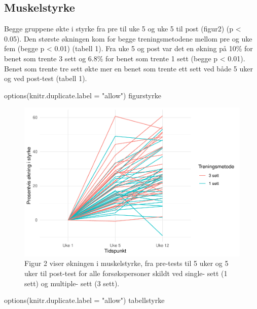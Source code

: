 \documentclass[
]{book}
\newenvironment{Shaded}{\begin{snugshade}}{\end{snugshade}}
\newcommand{\AttributeTok}[1]{\textcolor[rgb]{0.77,0.63,0.00}{#1}}
\newcommand{\FunctionTok}[1]{\textcolor[rgb]{0.00,0.00,0.00}{#1}}
\newcommand{\NormalTok}[1]{#1}
\newcommand{\StringTok}[1]{\textcolor[rgb]{0.31,0.60,0.02}{#1}}
\begin{document}
\hypertarget{muskelstyrke}{%
\subsection{Muskelstyrke}\label{muskelstyrke}}

Begge gruppene økte i styrke fra pre til uke 5 og uke 5 til post (figur2) (p \textless{} 0.05). Den største økningen kom for begge treningsmetodene mellom pre og uke fem (begge p \textless{} 0.01) (tabell 1). Fra uke 5 og post var det en økning på 10\% for benet som trente 3 sett og 6.8\% for benet som trente 1 sett (begge p \textless{} 0.01). Benet som trente tre sett økte mer en benet som trente ett sett ved både 5 uker og ved post-test (tabell 1).

\begin{Shaded}
\begin{Highlighting}[]
\FunctionTok{options}\NormalTok{(}\AttributeTok{knitr.duplicate.label =} \StringTok{"allow"}\NormalTok{)}
\NormalTok{figurstyrke}
\end{Highlighting}
\end{Shaded}

\begin{figure}
\centering
\includegraphics{_main_files/figure-latex/styrkefigur-1.pdf}
\caption{\label{fig:styrkefigur}Figur 2 viser økningen i muskelstyrke, fra pre-tests til 5 uker og 5 uker til post-test for alle forsøkspersoner skildt ved single- sett (1 sett) og multiple- sett (3 sett).}
\end{figure}

\begin{Shaded}
\begin{Highlighting}[]
\FunctionTok{options}\NormalTok{(}\AttributeTok{knitr.duplicate.label =} \StringTok{"allow"}\NormalTok{)}
\NormalTok{tabellstyrke}
\end{Highlighting}
\end{Shaded}
\end{document}
